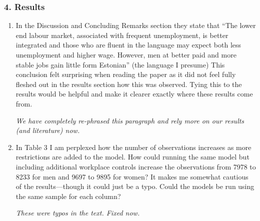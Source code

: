 \documentclass{article}
\newenvironment{response}
{\slshape}{}
\begin{document}
\subsubsection*{4. Results}

\begin{enumerate}
%

\item In the Discussion and Concluding Remarks section they state that
  “The lower end labour market, associated with frequent unemployment,
  is better integrated and those who are fluent in the language may
  expect both less unemployment and higher wage. However, men at
  better paid and more stable jobs gain little form Estonian” (the
  language I presume) This conclusion felt surprising when reading the
  paper as it did not feel fully fleshed out in the results section
  how this was observed. Tying this to the results would be helpful
  and make it clearer exactly where these results come from.

  \begin{response}
    We have completely re-phrased this paragraph and rely more on our
    results (and literature) now.
  \end{response}

\item In Table 3 I am perplexed how the number of observations increases as more restrictions are added to the model. How could running the same model but including additional workplace controls increase the observations from 7978 to 8233 for men and 9697 to 9895 for women? It makes me somewhat cautious of the results—though it could just be a typo. Could the models be run using the same sample for each column?

  \begin{response}
    These were typos in the text.  Fixed now.
  \end{response}

\end{enumerate}
\end{document}
